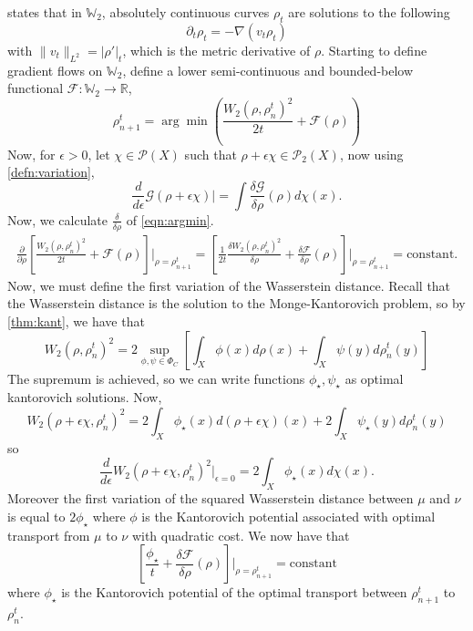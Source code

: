 \documentclass[12pt]{article}
\newcommand{\R}{\mathbb{R}}
\theoremstyle{plain}
\numberwithin{equation}{section}
\begin{document}
\cite{santambrogio} states that in $\mathbb{W}_2$, absolutely continuous curves $\rho_t$ are solutions to the following 
\[\partial_t \rho_t = -\nabla(v_t\rho_t) \]
with $\|v_t\|_{L^2} = |\rho'|_t$, which is the metric derivative of $\rho$. Starting to define gradient flows on $\mathbb{W}_2$, define a lower semi-continuous and bounded-below functional $\mathcal{F}: \mathbb{W}_2\to \R$,
\begin{equation}\label{eqn:argmin}\rho_{n+1}^t = \arg\min \left(\frac{W_2(\rho,\rho^t_n)^2}{2t} + \mathcal{F}(\rho)\right)\end{equation}
Now, for $\epsilon > 0$, let $\chi \in \mathcal{P}(X)$ such that $\rho + \epsilon \chi \in \mathcal{P}_2(X)$, now using \autoref{defn:variation},
\[\frac{d}{d\epsilon} \mathcal{G}(\rho + \epsilon\chi)\vert = \int \frac{\delta \mathcal{G}}{\delta\rho}(\rho)d\chi(x).\]
Now, we calculate $\frac{\delta}{\delta \rho}$ of \autoref{eqn:argmin}.
\begin{align*}
  \frac{\partial}{\partial\rho}\left[\frac{W_2(\rho,\rho_n^t)^2}{2t} + \mathcal{F}(\rho)\right]\bigg\vert_{\rho=\rho_{n+1}^t} = \left[\frac{1}{2t}\frac{\delta W_2(\rho,\rho_n^t)^2}{\delta \rho} + \frac{\delta \mathcal{F}}{\delta \rho}(\rho)\right]\bigg\vert_{\rho=\rho_{n+1}^t} = \text{constant}.
\end{align*}
Now, we must define the first variation of the Wasserstein distance. Recall that the Wasserstein distance is the solution to the Monge-Kantorovich problem, so by \autoref{thm:kant}, we have that
\[W_2(\rho, \rho_{n}^t)^2 = 2\sup_{\phi,\psi\in \Phi_C}\left[\int_{X}\phi(x)d\rho(x) + \int_X\psi(y)d\rho_{n}^t(y)\right]\] 
The supremum is achieved, so we can write functions $\phi_\star,\psi_\star$ as optimal kantorovich solutions. Now, 
\[W_2(\rho+\epsilon\chi, \rho_{n}^t)^2 = 2\int_{X}\phi_\star(x)d(\rho+\epsilon\chi)(x) + 2\int_X\psi_\star(y)d\rho_{n}^t(y)\]
so 
\[ \frac{d}{d\epsilon}W_2(\rho+\epsilon\chi, \rho_{n}^t)^2\vert_{\epsilon=0} = 2\int_{X}\phi_\star(x)d\chi(x).\]
Moreover the first variation of the squared Wasserstein distance between $\mu$ and $\nu$ is equal to $2\phi_\star$ where $\phi$ is the Kantorovich potential associated with optimal transport from $\mu$ to $\nu$ with quadratic cost. We now have that 
\begin{equation}\label{eqn:firstvar}\left[\frac{\phi_\star}{t} + \frac{\delta \mathcal{F}}{\delta \rho}(\rho)\right]\bigg\vert_{\rho=\rho_{n+1}^t} = \text{constant}\end{equation}
where $\phi_\star$ is the Kantorovich potential of the optimal transport between $\rho_{n+1}^t$ to $\rho_{n}^t$. 
\end{document}
